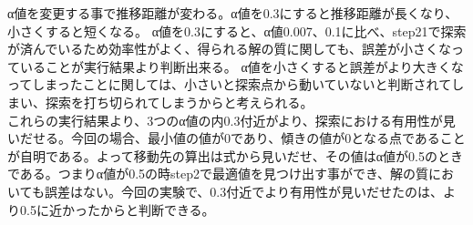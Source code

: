 α値を変更する事で推移距離が変わる。α値を0.3にすると推移距離が長くなり、小さくすると短くなる。
α値を0.3にすると、α値0.007、0.1に比べ、step21で探索が済んでいるため効率性がよく、得られる解の質に関しても、誤差が小さくなっていることが実行結果より判断出来る。
α値を小さくすると誤差がより大きくなってしまったことに関しては、小さいと探索点から動いていないと判断されてしまい、探索を打ち切られてしまうからと考えられる。\\
これらの実行結果より、3つのα値の内0.3付近がより、探索における有用性が見いだせる。今回の場合、最小値の値が0であり、傾きの値が0となる点であることが自明である。よって移動先の算出は式から見いだせ、その値はα値が0.5のときである。つまりα値が0.5の時step2で最適値を見つけ出す事ができ、解の質においても誤差はない。今回の実験で、0.3付近でより有用性が見いだせたのは、より0.5に近かったからと判断できる。

